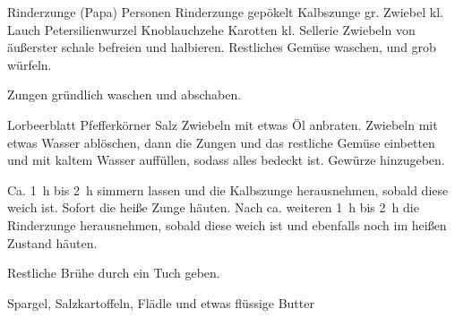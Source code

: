 \begin{MyRecipe}{Rinderzunge (Papa)}{ Personen}{}
	\ingredient[\Calc{1}{\x}]{} {Rinderzunge gepökelt}
	\ingredient[\Calc{1}{\x}]{} {Kalbszunge}
	\ingredient[\Calc{1}{\x}]{} {gr. Zwiebel}
	\ingredient[\Calc{1}{\x}]{} {kl. Lauch}
	\ingredient[\Calc{1}{\x}]{} {Petersilienwurzel}
	\ingredient[\Calc{1}{\x}]{} {Knoblauchzehe}
	\ingredient[\Calc{2}{\x}]{} {Karotten}
	\ingredient[\Calc{0.5}{\x}]{} {kl. Sellerie}
	Zwiebeln von äußerster schale befreien und halbieren. Restliches Gemüse waschen, und grob würfeln.

	Zungen gründlich waschen und abschaben.\par\bigskip
	
	\ingredient[\Calc{1}{\x}]{} {Lorbeerblatt}
	 {Pfefferkörner}
	 {Salz}
	Zwiebeln mit etwas Öl anbraten. Zwiebeln mit etwas Wasser ablöschen, dann die Zungen und das restliche Gemüse einbetten und mit kaltem Wasser auffüllen, sodass alles bedeckt ist.
	Gewürze hinzugeben.\par\bigskip
	
	Ca. \SI{1}{\hour} bis \SI{2}{\hour} simmern lassen und die Kalbszunge herausnehmen, sobald diese weich ist. Sofort die heiße Zunge häuten. Nach ca. weiteren \SI{1}{\hour} bis \SI{2}{\hour} die Rinderzunge herausnehmen, sobald diese weich ist und ebenfalls noch im heißen Zustand häuten.

	Restliche Brühe durch ein Tuch geben.\par\bigskip

	Spargel, Salzkartoffeln, Flädle und etwas flüssige Butter
	

	
	
	
\end{MyRecipe}